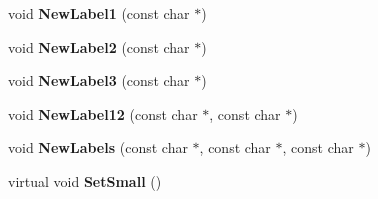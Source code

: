 \begin{DoxyCompactItemize}
\item 
\hypertarget{classTOnePadDisplay_ab057c6d5c7a6616cbf2de141ff438ced}{
void {\bfseries NewLabel1} (const char $\ast$)}
\label{classTOnePadDisplay_ab057c6d5c7a6616cbf2de141ff438ced}

\item 
\hypertarget{classTOnePadDisplay_a421c77b970e10697b7393973fe73595a}{
void {\bfseries NewLabel2} (const char $\ast$)}
\label{classTOnePadDisplay_a421c77b970e10697b7393973fe73595a}

\item 
\hypertarget{classTOnePadDisplay_a0a7123830cd00d3840b71d18770b949a}{
void {\bfseries NewLabel3} (const char $\ast$)}
\label{classTOnePadDisplay_a0a7123830cd00d3840b71d18770b949a}

\item 
\hypertarget{classTOnePadDisplay_ae4edbbb5448058e06a39e52e2978b983}{
void {\bfseries NewLabel12} (const char $\ast$, const char $\ast$)}
\label{classTOnePadDisplay_ae4edbbb5448058e06a39e52e2978b983}

\item 
\hypertarget{classTOnePadDisplay_a9781feddc47f3899828847d99a18bade}{
void {\bfseries NewLabels} (const char $\ast$, const char $\ast$, const char $\ast$)}
\label{classTOnePadDisplay_a9781feddc47f3899828847d99a18bade}

\item 
\hypertarget{classTOnePadDisplay_a81a6d7a95df514c5757bc4f5ee2ff3d6}{
virtual void {\bfseries SetSmall} ()}
\label{classTOnePadDisplay_a81a6d7a95df514c5757bc4f5ee2ff3d6}

\end{DoxyCompactItemize}
